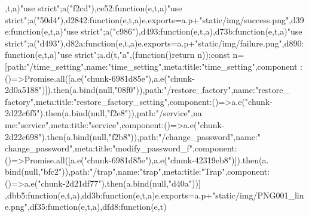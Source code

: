 ,t,a){"use strict";a("f2cd")},ce52:function(e,t,a){"use
strict";a("50d4")},d2842:function(e,t,a){e.exports=a.p+"static/img/success.png"},d39e:function(e,t,a){"use
strict";a("c986")},d493:function(e,t,a){},d73b:function(e,t,a){"use
strict";a("d493")},d82a:function(e,t,a){e.exports=a.p+"static/img/failure.png"},d890:function(e,t,a){"use
strict";a.d(t,"a",(function(){return n}));const n=[{path:"/time_setting",name:"time_setting",meta:{title:"time_setting"},component
:()=>Promise.all([a.e("chunk-6981d85e"),a.e("chunk-2d0a5188")]).then(a.bind(null,"08f0"))},{path:"/restore_factory",name:"restore_
factory",meta:{title:"restore_factory_setting"},component:()=>a.e("chunk-2d22c6f5").then(a.bind(null,"f2e8"))},{path:"/service",na
me:"service",meta:{title:"service"},component:()=>a.e("chunk-2d22c698").then(a.bind(null,"f2b8"))},{path:"/change_password",name:"
change_password",meta:{title:"modify_password_f"},component:()=>Promise.all([a.e("chunk-6981d85e"),a.e("chunk-42319eb8")]).then(a.
bind(null,"bfc2"))},{path:"/trap",name:"trap",meta:{title:"Trap"},component:()=>a.e("chunk-2d21df77").then(a.bind(null,"d40a"))}]}
,dbb5:function(e,t,a){},dd3b:function(e,t,a){e.exports=a.p+"static/img/PNG001_line.png"},df35:function(e,t,a){},dfd8:function(e,t)

